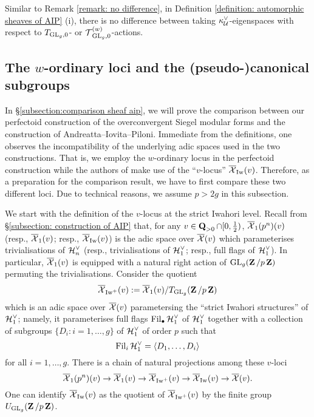 \begin{Remark}\label{remark: no difference 2}
\normalfont Similar to Remark \ref{remark: no difference}, in Definition \ref{definition: automorphic sheaves of AIP} (i), there is no difference between taking $\kappa_{\operatorname{\mathcal{U}}}^{\vee}$-eigenspaces with respect to $T_{\operatorname{GL}_g,0}$- or $\operatorname{\mathcal{T}}^{(w)}_{\operatorname{GL}_g,0}$-actions.
\end{Remark}


\subsection{The \texorpdfstring{$w$}{w}-ordinary loci and the (pseudo-)canonical subgroups}\label{subsection: pseudocanonical subgroups}
In \S \ref{subsection:comparison sheaf aip}, we will prove the comparison between our perfectoid construction of the overconvergent Siegel modular forms and the construction of Andreatta--Iovita--Piloni. Immediate from the definitions, one observes the incompatibility of the underlying adic spaces used in the two constructions. That is, we employ the $w$-ordinary locus in the perfectoid construction while the authors of \cite{AIP-2015} make use of the ``$v$-locus'' $\overline{\operatorname{\mathcal{X}}}_{\operatorname{Iw}}(v)$. Therefore, as a preparation for the comparison result, we have to first compare these two different loci. Due to technical reasons, we assume $p>2g$ in this subsection. 

We start with the definition of the $v$-locus at the strict Iwahori level. Recall from \S \ref{subsection: construction of AIP} that, for any $v\in \operatorname{\mathbf{Q}}_{>0}\cap [0,\frac{1}{2})$, $\overline{\operatorname{\mathcal{X}}}_1(p^n)(v)$ (resp., $\overline{\operatorname{\mathcal{X}}}_1(v)$; resp., $\overline{\operatorname{\mathcal{X}}}_{\operatorname{Iw}}(v)$) is the adic space over $\overline{\operatorname{\mathcal{X}}}(v)$ which parameterises trivialisations of $\operatorname{\mathcal{H}}_n^{\vee}$ (resp., trivialisations of $\operatorname{\mathcal{H}}_1^{\vee}$; resp., full flags of $\operatorname{\mathcal{H}}_1^{\vee}$). In particular, $\overline{\operatorname{\mathcal{X}}}_1(v)$ is equipped with a natural right action of $\operatorname{GL}_g(\operatorname{\mathbf{Z}}/p\operatorname{\mathbf{Z}})$ permuting the trivialisations. Consider the quotient
$$\overline{\operatorname{\mathcal{X}}}_{\operatorname{Iw}^+}(v):=\overline{\operatorname{\mathcal{X}}}_1(v)/T_{\operatorname{GL}_g}(\operatorname{\mathbf{Z}}/p\operatorname{\mathbf{Z}})$$
which is an adic space over $\overline{\operatorname{\mathcal{X}}}(v)$ parametersing the ``strict Iwahori structures'' of $\operatorname{\mathcal{H}}_1^{\vee}$; namely, it parameterises full flags $\operatorname{Fil}_{\bullet}\operatorname{\mathcal{H}}_1^{\vee}$ of $\operatorname{\mathcal{H}}_1^{\vee}$ together with a collection of subgroups $\{D_i: i=1, \ldots, g\}$ of $\operatorname{\mathcal{H}}_1^{\vee}$ of order $p$ such that 
$$\operatorname{Fil}_i\operatorname{\mathcal{H}}_1^{\vee}=\langle D_1, \ldots, D_i\rangle$$
for all $i=1, \ldots, g$. There is a chain of natural projections among these $v$-loci
$$\overline{\operatorname{\mathcal{X}}}_1(p^n)(v)\rightarrow\overline{\operatorname{\mathcal{X}}}_1(v)\rightarrow\overline{\operatorname{\mathcal{X}}}_{\operatorname{Iw}^+}(v)\rightarrow\overline{\operatorname{\mathcal{X}}}_{\operatorname{Iw}}(v)\rightarrow\overline{\operatorname{\mathcal{X}}}(v).$$ One can identify $\overline{\operatorname{\mathcal{X}}}_{\operatorname{Iw}}(v)$ as the quotient of $\overline{\operatorname{\mathcal{X}}}_{\operatorname{Iw}^+}(v)$ by the finite group $U_{\operatorname{GL}_g}(\operatorname{\mathbf{Z}}/p\operatorname{\mathbf{Z}})$.

